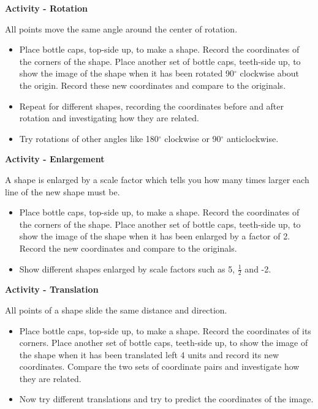 		\noindent \textbf{Activity - Rotation}
		
		\noindent All points move the same angle around the center of rotation.
		\begin{itemize}
		
	\item Place bottle caps, top-side up, to make a shape. Record the coordinates of the corners of the shape. Place another set of bottle caps, teeth-side up, to show the image of the shape when it has been rotated 90$^\circ$ clockwise about the origin. Record these new coordinates and compare to the originals.	
	\item Repeat for different shapes, recording the  coordinates before and after rotation and investigating how they are related.
	\item Try rotations of other angles like 180$^\circ$ clockwise or 90$^\circ$ anticlockwise.
		\end{itemize}		
		
		\noindent \textbf{Activity - Enlargement}
		
		\noindent A shape is enlarged by a scale factor which tells you how many times larger each line of the new shape must be.
		\begin{itemize}
		
	\item Place bottle caps, top-side up, to make a shape. Record the coordinates of the corners of the shape. Place another set of bottle caps, teeth-side up, to show the image of the shape when it has been enlarged by a factor of 2. Record the new coordinates and compare to the originals.
	\item Show different shapes enlarged by scale factors such as 5, $\frac{1}{2}$ and -2.	
		\end{itemize}
		
		\noindent \textbf{Activity - Translation}
		
		\noindent All points of a shape slide the same distance and direction.
		\begin{itemize}
		\item Place bottle caps, top-side up, to make a shape. Record the coordinates of its corners. Place another set of bottle caps, teeth-side up, to show the image of the shape when it has been translated left 4 units and record its new coordinates. Compare the two sets of coordinate pairs and investigate how they are related.
		\item Now try different translations and try to predict the coordinates of the image.
\end{itemize}			
	
